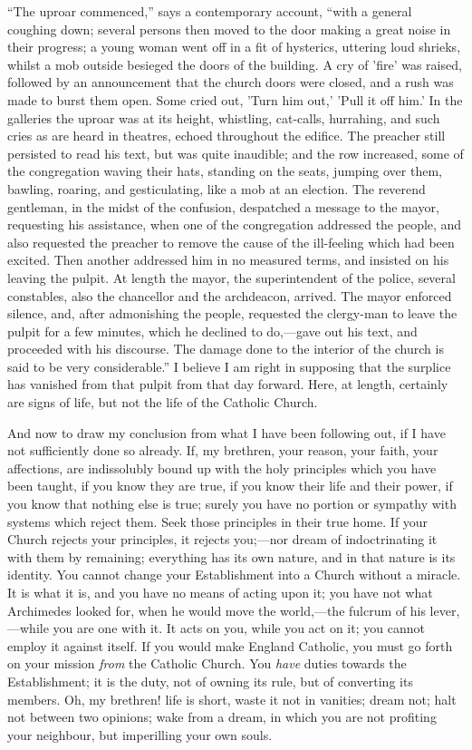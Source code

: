 ``The uproar commenced,'' says a contemporary account,
``with a general coughing down; several persons then moved to the
door making a great noise in their progress; a young woman went off in
a fit of hysterics, uttering loud shrieks, whilst a mob outside
besieged the doors of the building. A cry of 'fire' was raised,
followed by an announcement that the church doors were closed, and a
rush was made to burst them open. Some cried out, 'Turn him out,'
'Pull it off him.' In the galleries the uproar was at its height,
whistling, cat-calls, hurrahing, and such cries as are heard in
theatres, echoed throughout the edifice. The preacher still persisted
to read his text, but was quite inaudible; and the row increased, some
of the congregation waving their hats, standing on the seats, jumping
over them, bawling, roaring, and gesticulating, like a mob at an
election. The reverend gentleman, in the midst of the confusion,
despatched a message to the mayor, requesting his assistance, when one
of the congregation addressed the people, and also requested the
preacher to remove the cause of the ill-feeling which had been
excited. Then another addressed him in no measured terms, and insisted
on his leaving the pulpit. At length the mayor, the superintendent of
the police, several constables, also the chancellor and the
archdeacon, arrived. The mayor enforced silence, and, after
admonishing the people, requested the clergy-man to leave the pulpit
for a few minutes, which he declined to do,—gave out his text, and
proceeded with his discourse. The damage done to the interior of the
church is said to be very considerable.'' I believe I am right in
supposing that the surplice has vanished from that pulpit from that
day forward. Here, at length, certainly are signs of life, but not the
life of the Catholic Church.

And now to draw my conclusion from what I have been following out,
if I have not sufficiently done so already. If, my brethren, your
reason, your faith, your affections, are indissolubly bound up with
the holy principles which you have been taught, if you know they are
true, if you know their life and their power, if you know that nothing
else is true; surely you have no portion or sympathy with systems
which reject them. Seek those principles in their true home. If your
Church rejects your principles, it rejects you;—nor dream of
indoctrinating it with them by remaining; everything has its own
nature, and in that nature is its identity. You cannot change your
Establishment into a Church without a miracle. It is what it is, and
you have no means of acting upon it; you have not what Archimedes
looked for, when he would move the world,—the fulcrum of his lever,—while
you are one with it. It acts on you, while you act on it; you cannot
employ it against itself. If you would make England Catholic, you must
go forth on your mission \emph{from} the Catholic Church. You \emph{have}
duties towards the Establishment; it is the duty, not of owning its
rule, but of converting its members. Oh, my brethren! life is short,
waste it not in vanities; dream not; halt not between two opinions;
wake from a dream, in which you are not profiting your neighbour, but
imperilling your own souls.

